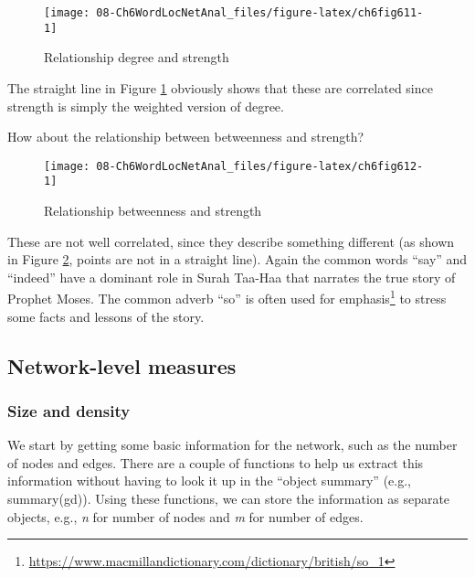 \documentclass[
]{article}
\begin{document}
\begin{figure}

{\centering \texttt{[image: 08-Ch6WordLocNetAnal\_files/figure-latex/ch6fig611-1]} 

}

\caption{Relationship degree and strength}\label{fig:ch6fig611}
\end{figure}

The straight line in Figure \ref{fig:ch6fig611} obviously shows that these are correlated since strength is simply the weighted version of degree.

How about the relationship between betweenness and strength?

\begin{figure}

{\centering \texttt{[image: 08-Ch6WordLocNetAnal\_files/figure-latex/ch6fig612-1]} 

}

\caption{Relationship betweenness and strength}\label{fig:ch6fig612}
\end{figure}

These are not well correlated, since they describe something different (as shown in Figure \ref{fig:ch6fig612}, points are not in a straight line). Again the common words ``say'' and ``indeed'' have a dominant role in Surah Taa-Haa that narrates the true story of Prophet Moses. The common adverb ``so'' is often used for emphasis\footnote{\url{https://www.macmillandictionary.com/dictionary/british/so_1}} to stress some facts and lessons of the story.

\hypertarget{network-level-measures}{%
\subsection{Network-level measures}\label{network-level-measures}}

\hypertarget{size-and-density}{%
\subsubsection{Size and density}\label{size-and-density}}

We start by getting some basic information for the network, such as the number of nodes and edges. There are a couple of functions to help us extract this information without having to look it up in the ``object summary'' (e.g., summary(gd)). Using these functions, we can store the information as separate objects, e.g., \emph{n} for number of nodes and \emph{m} for number of edges.
\end{document}
